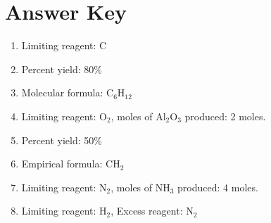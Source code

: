 \documentclass{article}
\begin{document}
\section*{Answer Key}
\begin{enumerate}
    \item Limiting reagent: C
    \item Percent yield: 80\%
    \item Molecular formula: \(\text{C}_6\text{H}_{12}\)
    \item Limiting reagent: \(\text{O}_2\), moles of \(\text{Al}_2\text{O}_3\) produced: 2 moles.
    \item Percent yield: 50\%
    \item Empirical formula: \(\text{CH}_2\)
    \item Limiting reagent: \(\text{N}_2\), moles of \(\text{NH}_3\) produced: 4 moles.
    \item Limiting reagent: \(\text{H}_2\), Excess reagent: \(\text{N}_2\)
\end{enumerate}
\end{document}
